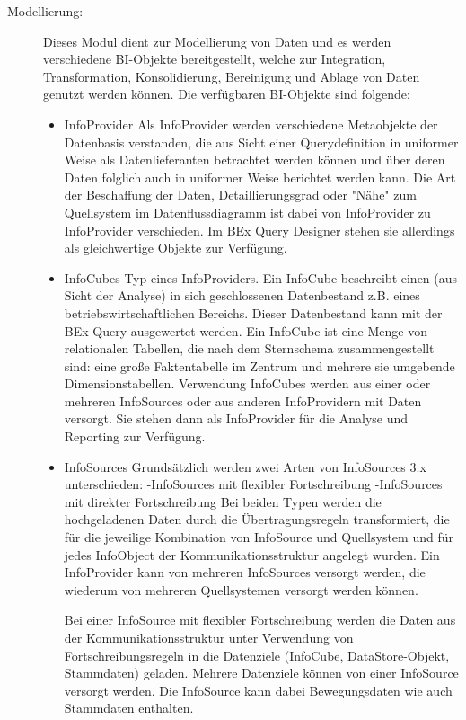 \begin{description}
\item[Modellierung:] Dieses Modul dient zur Modellierung von Daten und es werden verschiedene BI-Objekte bereitgestellt, welche zur Integration, Transformation, Konsolidierung, Bereinigung und Ablage von Daten genutzt werden können. Die verfügbaren BI-Objekte sind folgende:
\begin{itemize}
\item InfoProvider
Als InfoProvider werden verschiedene Metaobjekte der Datenbasis verstanden, die aus Sicht einer Querydefinition in uniformer Weise als Datenlieferanten betrachtet werden können und über deren Daten folglich auch in uniformer Weise berichtet werden kann. Die Art der Beschaffung der Daten, Detaillierungsgrad oder "Nähe" zum Quellsystem im Datenflussdiagramm ist dabei von InfoProvider zu InfoProvider verschieden. Im BEx Query Designer stehen sie allerdings als gleichwertige Objekte zur Verfügung. 

\item InfoCubes
Typ eines InfoProviders.
Ein InfoCube beschreibt einen (aus Sicht der Analyse) in sich geschlossenen Datenbestand z.B. eines betriebswirtschaftlichen Bereichs. Dieser Datenbestand kann mit der BEx Query ausgewertet werden. 
Ein InfoCube ist eine Menge von relationalen Tabellen, die nach dem Sternschema zusammengestellt sind: eine große Faktentabelle im Zentrum und mehrere sie umgebende Dimensionstabellen.
Verwendung
InfoCubes werden aus einer oder mehreren InfoSources oder aus anderen InfoProvidern mit Daten versorgt. Sie stehen dann als InfoProvider für die Analyse und Reporting zur Verfügung.


\item InfoSources
Grundsätzlich werden zwei Arten von InfoSources 3.x unterschieden:
-InfoSources mit flexibler Fortschreibung
-InfoSources mit direkter Fortschreibung
Bei beiden Typen werden die hochgeladenen Daten durch die Übertragungsregeln transformiert, die für die jeweilige Kombination von InfoSource und Quellsystem und für jedes InfoObject der Kommunikationsstruktur angelegt wurden. Ein InfoProvider kann von mehreren InfoSources versorgt werden, die wiederum von mehreren Quellsystemen versorgt werden können.


Bei einer InfoSource mit flexibler Fortschreibung werden die Daten aus der Kommunikationsstruktur unter Verwendung von Fortschreibungsregeln in die Datenziele (InfoCube, DataStore-Objekt, Stammdaten) geladen. Mehrere Datenziele können von einer InfoSource versorgt werden. Die InfoSource kann dabei Bewegungsdaten wie auch Stammdaten enthalten.


\end{itemize}
\end{description}
